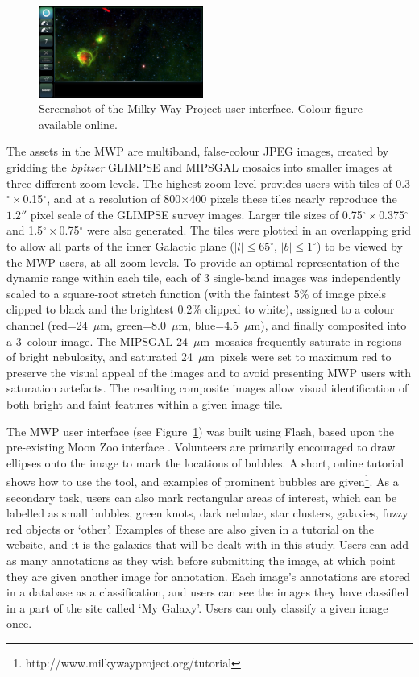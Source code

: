 \documentclass[times,usenatbib]{mn2e}
\newcommand{\um}{$\mu$m}
\newcommand{\degree}{^{\circ}}
\begin{document}
\begin{figure}
\includegraphics[width=0.48\textwidth]{./figures/user-interface.eps}
\caption{Screenshot of the Milky Way Project user interface. Colour figure available online.}
\label{user-interface}
\end{figure}

The assets in the MWP are multiband, false-colour JPEG images, created by gridding the {\it Spitzer} GLIMPSE and MIPSGAL mosaics into smaller images at three different zoom levels. The highest zoom level provides users with tiles of 0.3$^{\circ}\times$0.15$^{\circ}$, and at a resolution of 800$\times$400 pixels these tiles nearly reproduce the $1.2''$ pixel scale of the GLIMPSE survey images. Larger tile sizes of 0.75$^{\circ}\times$0.375$^{\circ}$ and 1.5$^{\circ}\times$0.75$^{\circ}$ were also generated. The tiles were plotted in an overlapping grid to allow all parts of the inner Galactic plane ($|l|\le 65\degree$, $|b|\le 1\degree$) to be viewed by the MWP users, at all zoom levels. To provide an optimal representation of the dynamic range within each tile, each of 3 single-band images was independently scaled to a square-root stretch function (with the faintest 5\% of image pixels clipped to black and the brightest 0.2\% clipped to white), assigned to a colour channel (red=24~\um, green=8.0~\um, blue=4.5~\um), and finally composited into a 3--colour image. The MIPSGAL 24~\um\ mosaics frequently saturate in regions of bright nebulosity, and saturated 24~\um\ pixels were set to maximum red to preserve the visual appeal of the images and to avoid presenting MWP users with saturation artefacts. The resulting composite images allow visual identification of both bright and faint features within a given image tile.

The MWP user interface (see Figure~\ref{user-interface}) was built using Flash, based upon the pre-existing Moon Zoo interface \citep{Joy+11}. Volunteers are primarily encouraged to draw ellipses onto the image to mark the locations of bubbles. A short, online tutorial shows how to use the tool, and examples of prominent bubbles are given\footnote{http://www.milkywayproject.org/tutorial}. As a secondary task, users can also mark rectangular areas of interest, which can be labelled as small bubbles, green knots, dark nebulae, star clusters, galaxies, fuzzy red objects or `other'. Examples of these are also given in a tutorial on the website, and it is the galaxies that will be dealt with in this study. Users can add as many annotations as they wish before submitting the image, at which point they are given another image for annotation. Each image's annotations are stored in a database as a classification, and users can see the images they have classified in a part of the site called `My Galaxy'. Users can only classify a given image once.
\end{document}
